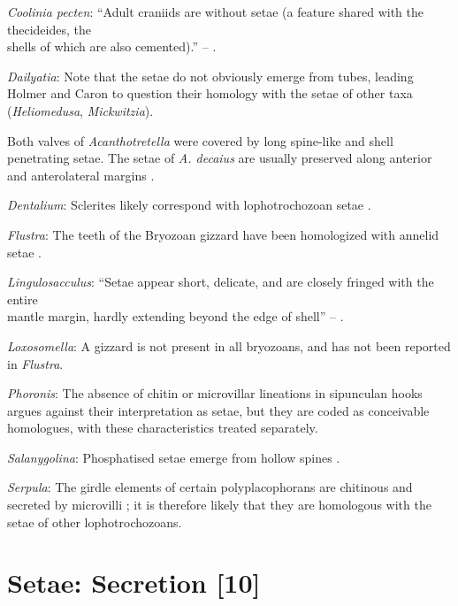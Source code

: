 \documentclass[openany]{book}
\theoremstyle{definition}
\theoremstyle{definition}
\theoremstyle{definition}
\theoremstyle{remark}
\begin{document}
\hypertarget{Coolinia_pecten-coding-9}{}
\emph{Coolinia pecten}: ``Adult craniids are without setae (a feature
shared with the thecideides, the\\
shells of which are also cemented).'' -- \citet{Williams2007Supplement}.

\hypertarget{Dailyatia-coding-9}{}
\emph{Dailyatia}: Note that the setae do not obviously emerge from
tubes, leading Holmer and Caron to question their homology with the
setae of other taxa (\emph{Heliomedusa}, \emph{Mickwitzia}).

Both valves of \emph{Acanthotretella} were covered by long spine-like
and shell penetrating setae. The setae of \emph{A. decaius} are usually
preserved along anterior and anterolateral margins
\citep{Hu2010Softpart}.

\hypertarget{Dentalium-coding-9}{}
\emph{Dentalium}: Sclerites likely correspond with lophotrochozoan setae
\citep{Butterfield1990, Smith2014, Zhang2015}.

\hypertarget{Flustra-coding-9}{}
\emph{Flustra}: The teeth of the Bryozoan gizzard have been homologized
with annelid setae \citep{Gordon1975}.

\hypertarget{Lingulosacculus-coding-9}{}
\emph{Lingulosacculus}: ``Setae appear short, delicate, and are closely
fringed with the entire\\
mantle margin, hardly extending beyond the edge of shell'' --
\citet{Zhang2005}.

\hypertarget{Loxosomella-coding-9}{}
\emph{Loxosomella}: A gizzard is not present in all bryozoans, and has
not been reported in \emph{Flustra}.

\hypertarget{Phoronis-coding-9}{}
\emph{Phoronis}: The absence of chitin or microvillar lineations in
sipunculan hooks argues against their interpretation as setae, but they
are coded as conceivable homologues, with these characteristics treated
separately.

\hypertarget{Salanygolina-coding-9}{}
\emph{Salanygolina}: Phosphatised setae emerge from hollow spines
\citep{Popov2009Earlyontogeny}.

\hypertarget{Serpula-coding-9}{}
\emph{Serpula}: The girdle elements of certain polyplacophorans are
chitinous and secreted by microvilli
\citep{Fischer1980, Leise1982, Leise1988}; it is therefore likely that
they are homologous with the setae of other lophotrochozoans.

\section{Setae: Secretion {[}10{]}}\label{setae-secretion-10}
\end{document}
